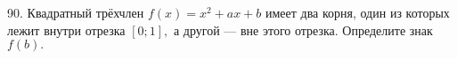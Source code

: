90. Квадратный трёхчлен $f(x)=x^2+ax+b$ имеет два корня, один из которых лежит внутри отрезка  $[0;1],$ а
другой --- вне этого отрезка. Определите знак $f(b).$\\
